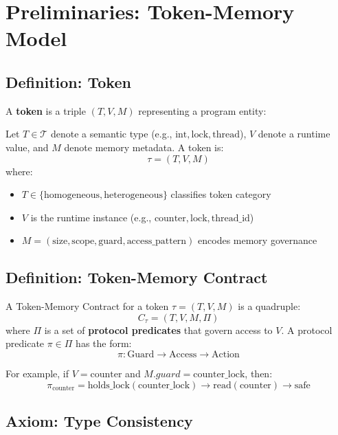\documentclass[11pt]{article}
\begin{document}
\section{Preliminaries: Token-Memory Model}

\subsection{Definition: Token}

A \textbf{token} is a triple $(T, V, M)$ representing a program entity:

\begin{definition}[Token]
Let $T \in \mathcal{T}$ denote a semantic type (e.g., $\text{int}, \text{lock}, \text{thread}$), $V$ denote a runtime value, and $M$ denote memory metadata. A token is:
\[
\tau = (T, V, M)
\]
where:
\begin{itemize}
    \item $T \in \{\text{homogeneous}, \text{heterogeneous}\}$ classifies token category
    \item $V$ is the runtime instance (e.g., $\text{counter}, \text{lock}, \text{thread\_id}$)
    \item $M = (\text{size}, \text{scope}, \text{guard}, \text{access\_pattern})$ encodes memory governance
\end{itemize}
\end{definition}

\subsection{Definition: Token-Memory Contract}

\begin{definition}
A Token-Memory Contract for a token $\tau = (T, V, M)$ is a quadruple:
\[
C_\tau = (T, V, M, \Pi)
\]
where $\Pi$ is a set of \textbf{protocol predicates} that govern access to $V$. A protocol predicate $\pi \in \Pi$ has the form:
\[
\pi: \text{Guard} \to \text{Access} \to \text{Action}
\]

For example, if $V = \text{counter}$ and $M.guard = \text{counter\_lock}$, then:
\[
\pi_{\text{counter}} = \text{holds\_lock}(\text{counter\_lock}) \to \text{read}(\text{counter}) \to \text{safe}
\]
\end{definition}

\subsection{Axiom: Type Consistency}
\end{document}
